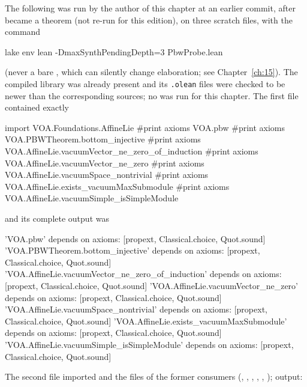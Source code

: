 The following was run by the author of this chapter at an earlier commit, after  became a theorem
(not re-run for this edition), on three scratch files, with the command
\begin{plaincode}
lake env lean -DmaxSynthPendingDepth=3 PbwProbe.lean
\end{plaincode}
(never a bare , which can silently change elaboration; see Chapter~\ref{ch:15}). The
compiled library was already present and its \texttt{.olean} files were checked to be newer than the
corresponding sources; no  was run for this chapter. The first file contained exactly
\begin{plaincode}
import VOA.Foundations.AffineLie
#print axioms VOA.pbw
#print axioms VOA.PBWTheorem.bottom_injective
#print axioms VOA.AffineLie.vacuumVector_ne_zero_of_induction
#print axioms VOA.AffineLie.vacuumVector_ne_zero
#print axioms VOA.AffineLie.vacuumSpace_nontrivial
#print axioms VOA.AffineLie.exists_vacuumMaxSubmodule
#print axioms VOA.AffineLie.vacuumSimple_isSimpleModule
\end{plaincode}
and its complete output was
\begin{plaincode}
'VOA.pbw' depends on axioms: [propext, Classical.choice, Quot.sound]
'VOA.PBWTheorem.bottom_injective' depends on axioms: [propext, Classical.choice, Quot.sound]
'VOA.AffineLie.vacuumVector_ne_zero_of_induction' depends on axioms: [propext, Classical.choice, Quot.sound]
'VOA.AffineLie.vacuumVector_ne_zero' depends on axioms: [propext, Classical.choice, Quot.sound]
'VOA.AffineLie.vacuumSpace_nontrivial' depends on axioms: [propext, Classical.choice, Quot.sound]
'VOA.AffineLie.exists_vacuumMaxSubmodule' depends on axioms: [propext, Classical.choice, Quot.sound]
'VOA.AffineLie.vacuumSimple_isSimpleModule' depends on axioms: [propext, Classical.choice, Quot.sound]
\end{plaincode}
The second file imported  and the files of the former
consumers (, ,
, , ,
); output:
